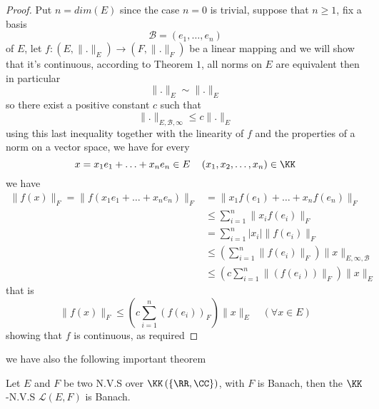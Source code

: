 \begin{proof}
Put $n = dim \left( E \right)$ since the case $n=0$ is trivial, suppose
that $n \geq 1$, fix a basis 
\[
\mathcal{B}  = \left( e_1, \hdots ,e_{n} \right) 
\]
of $E$, let $ f : \left( E,\| . \| _{E} \right) \longrightarrow 
\left( F,\| . \|_{F}  \right)$ be a linear mapping and we will show that
it's continuous, according to Theorem $1$, all norms on $E$ 
are equivalent then in particular 
\[
\| . \| _{E} \sim
\| . \| _{E}
\]
so there exist a positive constant $c$ such that 
\[
\| . \|_{E, \mathcal{B}, \infty  }  
\leq c \| . \| _{E}
\]
using this last inequality together with 
the linearity of $f$ and the properties of a norm on a vector space,
we have for every 
\[
x = x_1 e_1 + \hdots + x_{n}e_{n} \in E \quad 
\left( x_1,x_2, \hdots ,x_{n} \right) \in \KK
\]
we have 
\begin{align*}
\| f(x) \| _{F} =
\| f \left( x_1 e_1 + \hdots + x_{n}e_{n} \right) \| _{F} &=
\| x_1 f\left( e_1 \right) + \hdots + x_{n}f \left( e_{n} \right) \|  
_{F}   \\
							  & \leq 
			\sum_{i=1}^{n} 
			\| x_{i} f(e_{i})  \| _{F} \\
							  &=
							  \sum_{i=1}^{n} 
							  \left| x_{i} \right| 
						\| f(e_{i})  \| _{F} 
							\\
							 & \leq 
						\left( \sum_{i=1}^{n} 
						\| f(e_{i})  \|_{F} \right)
					\| x \| _{E,\infty ,\mathcal{B} } 
					\\
							 & \leq 
							\left( c 
							\sum_{i=1}^{n}
							\| \left( f(e_{i})  \right) \| 
						_{F}
					\right)
					\| x \| _{E}
\end{align*}
that is 
\[
\| f(x)  \| _{F} \leq 
\left( 
	c \sum_{i=1}^{n} 
	\left( f(e_{i})  \right)_{F}
\right)
\| x \| _{E} 
\quad \left( \forall  x \in E \right)
\]
showing that $f$ is continuous, as required
\end{proof}
\divider
we have also the following important theorem 
\begin{theorem}[]
Let $E$ and $F$ be two N.V.S over $\KK \left( 
	\left\{ \RR ,\CC  \right\}
\right)$, with $F$ is Banach, then the $\KK$-N.V.S 
$\mathcal{L} (E,F) $  is Banach.
\end{theorem}
